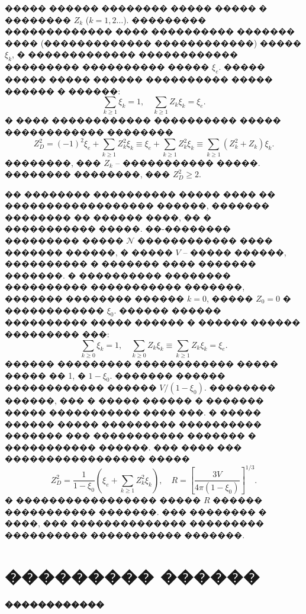 \documentclass[12pt,titlepage]{article}
\begin{document}
����� ������ �������� ����� ����� � �������� $Z_k$ ($k = 1, 2 \ldots$). ��������� ������������� ���� ���������� ������� ���� (������������� ������������) ����� $\xi_k$, � ������������� ������������ ��������� ���������� ����� $\xi_e$. ����� ����� ����� ������ ���������� ����� ������ � ������:
\begin{equation}
    \sum_{k \geq 1} \xi_k = 1, \quad \sum_{k \geq 1} Z_k \xi_k = \xi_e.
\end{equation}
� ���� ������������ ���������� ����� ������������ ��������
\begin{equation}
    Z_D^2 = (-1)^2 \xi_e + \sum_{k \geq 1} Z_k^2 \xi_k \equiv \xi_e + \sum_{k \geq 1} Z_k^2 \xi_k \equiv  \sum_{k \geq 1} \left( Z_k^2 + Z_k\right) \xi_k.
\end{equation}
��������, ��� $Z_k$ -- ����������� �����. �������� ��������, ��� $Z_D^2 \geq 2$.

�� �������� ���������� ����� ���� �� ������������������ ������, ������� �������� �� ������ ����, �� � ����������� �����. ��-�������� ��������� ����� $\mathcal{N}$ ������������ ���� ������� ������, � ����� $V$ -- ����� ������, ���������� � ������� ���� ������� �������. � ���������� �������� ���������� ����������� �������, ������� �������� ������ $k = 0$, ����� $Z_0 = 0$ � ������������ $\xi_0$. ������ ������ ���������� ����� ������ � ������ ������ ��������� ���:
\begin{equation}
    \sum_{k \geq 0} \xi_k = 1, \quad \sum_{k \geq 0} Z_k \xi_k \equiv \sum_{k \geq 1} Z_k \xi_k = \xi_e.
\end{equation}
������ ��������� ������������ ����� ����� �� 1, � $1 - \xi_0$. ������� ������ ������������ ������ $V/(1 - \xi_0)$. �������� ������, ��� � ����� ������ � ������� ����� ����������� ���� ���. � ����� ������ ����� ��������� ���������� ������� ��� ����������� ������� � ����������� ������. ��� ���� ��� ����������������� �����
\begin{equation}
    Z_D^2 = \frac{1}{1 - \xi_0} \left( \xi_e + \sum_{k \geq 1} Z_k^2 \xi_k \right), \quad R = \left[ \frac{3V}{4\pi (1 - \xi_0)} \right]^{1/3}.
\end{equation}
� ����������������� ����� $R$ ������ ����������� �������. ��� �������� � ����, ��� �������������� ��������� ���������� ����������� �������.

\section{��������� ������}

\textbf{������������}
\end{document}
